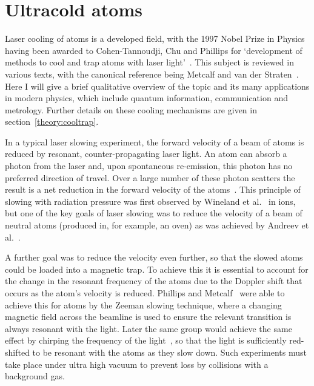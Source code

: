 \section{Ultracold atoms}
\label{intro:atoms}

Laser cooling of atoms is a developed field, with the 1997 Nobel Prize in
Physics having been awarded to Cohen-Tannoudji, Chu and Phillips for
`development of methods to cool and trap atoms with laser
light'~\cite{RevModPhys.70.721}. This subject is reviewed in various texts, with
the canonical reference being Metcalf and van der Straten~\cite{Metcalf1999}.
Here I will give a brief qualitative overview of the topic and its many
applications in modern physics, which include quantum information,
communication and metrology. Further details on these cooling mechanisms are
given in section~\ref{theory:cooltrap}.

In a typical laser slowing experiment, the forward velocity of a beam of atoms
is reduced by resonant, counter-propagating laser light. An atom can absorb a
photon from the laser and, upon spontaneous re-emission, this photon has no
preferred direction of travel. Over a large number of these photon scatters the
result is a net reduction in the forward velocity of the
atoms~\cite{PhysRevLett.40.1639}. This principle of slowing with radiation
pressure was first observed by Wineland et al.~\cite{PhysRevLett.40.1639} in
\Mg{} ions, but one of the key goals of laser slowing was to reduce the
velocity of a beam of neutral atoms (produced in, for example, an oven) as was
achieved by Andreev et al.~\cite{Andreev1981}.

A further goal was to reduce the velocity even further, so that the slowed atoms
could be loaded into a magnetic trap.  To achieve this it is essential to
account for the change in the resonant frequency of the atoms due to the
Doppler shift that occurs as the atom's velocity is reduced. Phillips and
Metcalf~\cite{PhysRevLett.48.596} were able to achieve this for \Na{} atoms by
the Zeeman slowing technique, where a changing magnetic field across the
beamline is used to ensure the relevant transition is always resonant with the
light. Later the same group would achieve the same effect by chirping the
frequency of the light~\cite{Prodan1984}, so that the light is sufficiently
red-shifted to be resonant with the atoms as they slow down.  Such experiments
must take place under ultra high vacuum to prevent loss by collisions with a
background gas.

